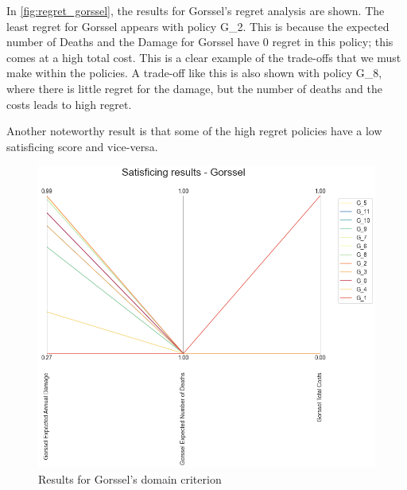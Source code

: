 \noindent In \autoref{fig:regret_gorssel}, the results for Gorssel's regret analysis are shown. The least regret for Gorssel appears with policy G\_2. This is because the expected number of Deaths and the Damage for Gorssel have 0 regret in this policy; this comes at a high total cost. This is a clear example of the trade-offs that we must make within the policies. A trade-off like this is also shown with policy G\_8, where there is little regret for the damage, but the number of deaths and the costs leads to high regret.

Another noteworthy result is that some of the high regret policies have a low satisficing score and vice-versa.

\begin{figure}[H]
  \centering
  \begin{minipage}[b]{0.4\textwidth}
    \includegraphics[width=1.15\textwidth]{report/figures/results/domain_criterion_Gorssel.png}
    \caption{Results for Gorssel's domain criterion}
    \label{fig:domain_criterion_gorssel}
  \end{minipage}
  \hfill
  \begin{minipage}[b]{0.4\textwidth}

\end{minipage}
\end{figure}
